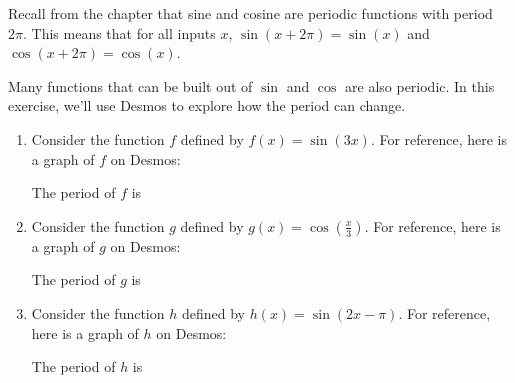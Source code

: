 \documentclass{ximera}
\author{Kenneth Berglund}
\begin{document}
\licenseSZ
\begin{exercise}
Recall from the chapter that sine and cosine are periodic functions with period $2\pi$. This means that for all inputs $x$, $\sin(x + 2\pi) = \sin(x)$ and $\cos(x + 2\pi) = \cos(x)$. 

Many functions that can be built out of $\sin$ and $\cos$ are also periodic. In this exercise, we'll use Desmos to explore how the period can change. 

\begin{enumerate}

\item Consider the function $f$ defined by $f(x) = \sin(3x)$. For reference, here is a graph of $f$ on Desmos:
\begin{center}
\end{center}

The period of $f$ is
\begin{multipleChoice}
\end{multipleChoice}

\item Consider the function $g$ defined by $g(x) = \cos\left(\frac{x}{3}\right)$. For reference, here is a graph of $g$ on Desmos:
\begin{center}
\end{center}

The period of $g$ is
\begin{multipleChoice}
\end{multipleChoice}

\item Consider the function $h$ defined by $h(x) = \sin(2x - \pi)$. For reference, here is a graph of $h$ on Desmos:
\begin{center}
\end{center}

The period of $h$ is
\begin{multipleChoice}
\end{multipleChoice}

\end{enumerate}

\end{exercise}
\end{document}
